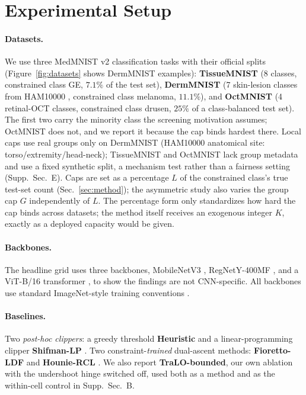 \documentclass[letterpaper]{article} %
\begin{document}
\section{Experimental Setup}
\label{sec:setup}

\paragraph{Datasets.}
We use three MedMNIST v2 \citep{yang2023medmnist} classification tasks with their
official splits (Figure~\ref{fig:datasets} shows DermMNIST examples):
\textbf{TissueMNIST} (8 classes, constrained class GE, $7.1\%$ of the test set),
\textbf{DermMNIST} (7 skin-lesion classes from HAM10000
\citep{tschandl2018ham10000}, constrained class melanoma, $11.1\%$), and
\textbf{OctMNIST} (4 retinal-OCT classes, constrained class drusen, $25\%$ of a
class-balanced test set). The first two carry the minority class the screening motivation
assumes; OctMNIST does not, and we report it because the cap binds hardest there. Local
caps use real groups only on DermMNIST (HAM10000 anatomical site:
torso/extremity/head-neck); TissueMNIST and OctMNIST lack group metadata and use a fixed
synthetic split, a mechanism test rather than a fairness setting (Supp.~Sec.~E). Caps
are set as a percentage $L$ of the
constrained class's true test-set count (Sec.~\ref{sec:method}); the asymmetric
study also varies the group cap $G$ independently of $L$. The percentage form only
standardizes how hard the cap binds across datasets; the method itself receives an
exogenous integer $K$, exactly as a deployed capacity would be given.

\paragraph{Backbones.}
The headline grid uses three backbones, MobileNetV3 \citep{howard2019searching},
RegNetY-400MF \citep{radosavovic2020designing}, and a ViT-B/16 transformer
\citep{dosovitskiy2020image}, to show the findings are not CNN-specific.
All backbones use standard ImageNet-style training conventions \citep{he2016deep}.

\paragraph{Baselines.}
Two \emph{post-hoc clippers}: a greedy threshold \textbf{Heuristic} and a
linear-programming clipper \textbf{Shifman-LP} \citep{shifman2025classification}. Two
constraint-\emph{trained} dual-ascent methods: \textbf{Fioretto-LDF}
\citep{fioretto2020lagrangian} and \textbf{Hounie-RCL} \citep{hounie2023resilient}. We
also report \textbf{TraLO-bounded}, our own ablation with the undershoot hinge switched
off, used both as a method and as the within-cell control in Supp.~Sec.~B.
\end{document}
